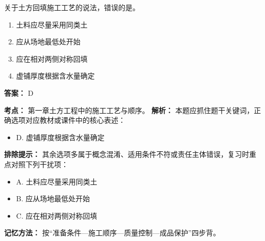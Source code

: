 \documentclass[UTF8,fontset=fandol,11pt]{ctexart}
\begin{document}
\begin{quizbox}[title={第 18 题}]
关于土方回填施工工艺的说法，错误的是。\\
\begin{enumerate}[label=\Alph*.]
\item 土料应尽量采用同类土
\item 应从场地最低处开始
\item 应在相对两侧对称回填
\item 虚铺厚度根据含水量确定
\end{enumerate}
\textbf{答案：} D
\vspace{0.25em}
\begin{answerbox}[title={考点解析}]
\textbf{考点：} 第一章土方工程中的施工工艺与顺序。
\textbf{解析：} 本题应抓住题干关键词，正确选项对应教材或课件中的核心表述：
\begin{itemize}
\item D. 虚铺厚度根据含水量确定
\end{itemize}
\textbf{排除提示：} 其余选项多属于概念混淆、适用条件不符或责任主体错误，复习时重点对照下列干扰项：
\begin{itemize}
\item A. 土料应尽量采用同类土
\item B. 应从场地最低处开始
\item C. 应在相对两侧对称回填
\end{itemize}
\textbf{记忆方法：} 按“准备条件—施工顺序—质量控制—成品保护”四步背。
\end{answerbox}
\end{quizbox}

\vspace{0.2em}
\end{document}
